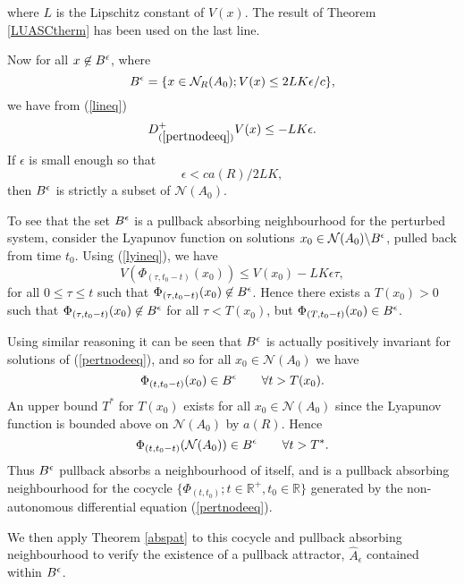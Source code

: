 \begin{prf}
where $L$ is the Lipschitz constant of $V(x)$. The
result of Theorem \ref{LUASCtherm} has been used on the last line.

Now for all $x \not \in B^{\epsilon}$, where
\[ B^{\epsilon} =  \{ x \in \mathcal{N}_{R}(A_0); V(x) \leq 2LK
                \epsilon/ c \}, \]
we have from (\ref{lineq})
\begin{equation}\label{lyineq}
  D^{+}_{(\ref{pertnodeeq})}V(x) \leq - LK \epsilon.
\end{equation}
If $\epsilon$ is small enough so that
\begin{equation}\label{pertsize}
  \epsilon < c a(R)/2LK,
\end{equation}
then $B^{\epsilon}$ is strictly a subset of $\mathcal{N}(A_0)$.

To see that the set $B^{\epsilon}$ is a pullback absorbing neighbourhood
for the perturbed system, consider the Lyapunov function on solutions $x_0
\in \mathcal{N}(A_0) \backslash B^{\epsilon}$, pulled
back from time $t_0$. Using (\ref{lyineq}), we have
\[ V(\Phi_{(\tau,t_0-t)}(x_0)) \leq V(x_0) - LK\epsilon \tau, \]
for all $0 \leq \tau \leq t$ such that $\Phi_{(\tau,t_0 - t)}(x_0) \not \in
B^{\epsilon}$. Hence there exists a $T(x_0) > 0$ such that $\Phi_{(\tau,t_0
- t)}(x_0) \not \in B^{\epsilon}$ for all $\tau < T(x_0)$, but
$\Phi_{(T,t_0 - t)}(x_0) \in B^{\epsilon}$.

Using similar reasoning it can be seen that $B^{\epsilon}$ is actually
positively invariant for solutions of (\ref{pertnodeeq}), and so for all
$x_0 \in \mathcal{N}(A_0)$ we have
\[ \Phi_{(t,t_0-t)}(x_0) \in B^{\epsilon} \qquad \forall t > T(x_0). \]
An upper bound $T^*$ for $T(x_0)$ exists for all $x_0 \in \mathcal{N}(A_0)$
since the Lyapunov function is bounded above on $\mathcal{N}(A_0)$ by
$a(R)$. Hence
\[ \Phi_{(t,t_0-t)}(\mathcal{N}(A_0)) \in B^{\epsilon} \qquad \forall t > T^*. \]
Thus $B^{\epsilon}$ pullback absorbs a neighbourhood of itself, and is a
pullback absorbing neighbourhood for the cocycle $\{ \Phi_{(t,t_0)}; t \in
\mathbb{R}^+, t_0 \in \mathbb{R} \}$ generated by the non-autonomous
differential equation (\ref{pertnodeeq}).

We then apply Theorem \ref{abspat} to this cocycle and pullback
absorbing neighbourhood to verify the existence of a pullback attractor,
$\hat{A}_{\epsilon}$ contained within $B^{\epsilon}$.


\end{prf}
